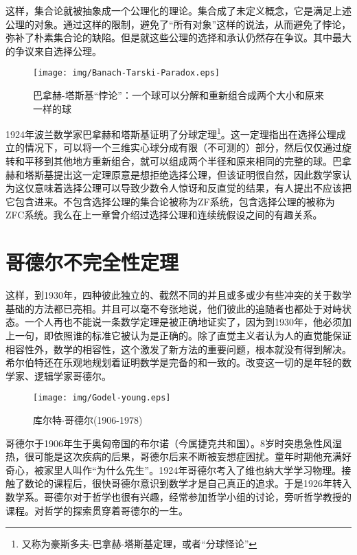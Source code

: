 \documentclass{article}
\begin{document}
这样，集合论就被抽象成一个公理化的理论。集合成了未定义概念，它是满足上述公理的对象。通过这样的限制，避免了“所有对象”这样的说法，从而避免了悖论，弥补了朴素集合论的缺陷。但是就这些公理的选择和承认仍然存在争议。其中最大的争议来自选择公理。

\begin{figure}[htbp]
 \centering
 \texttt{[image: img/Banach-Tarski-Paradox.eps]}
 \caption{巴拿赫-塔斯基“悖论”：一个球可以分解和重新组合成两个大小和原来一样的球}
 \label{fig:Banach-Tarski-Paradox}
\end{figure}

 
1924年波兰数学家巴拿赫和塔斯基证明了分球定理\footnote{又称为豪斯多夫-巴拿赫-塔斯基定理，或者“分球怪论”}。这一定理指出在选择公理成立的情况下，可以将一个三维实心球分成有限（不可测的）部分，然后仅仅通过旋转和平移到其他地方重新组合，就可以组成两个半径和原来相同的完整的球。巴拿赫和塔斯基提出这一定理原意是想拒绝选择公理，但该证明很自然，因此数学家认为这仅意味着选择公理可以导致少数令人惊讶和反直觉的结果，有人提出不应该把它包含进来。不包含选择公理的集合论被称为ZF系统，包含选择公理的被称为ZFC系统。我么在上一章曾介绍过选择公理和连续统假设之间的有趣关系。

\section{哥德尔不完全性定理}

这样，到1930年，四种彼此独立的、截然不同的并且或多或少有些冲突的关于数学基础的方法都已亮相。并且可以毫不夸张地说，他们彼此的追随者也都处于对峙状态。一个人再也不能说一条数学定理是被正确地证实了，因为到1930年，他必须加上一句，即依照谁的标准它被认为是正确的。除了直觉主义者认为人的直觉能保证相容性外，数学的相容性，这个激发了新方法的重要问题，根本就没有得到解决。希尔伯特还在乐观地规划着证明数学是完备的和一致的。改变这一切的是年轻的数学家、逻辑学家哥德尔。

\begin{wrapfigure}{L}{0.4\textwidth}
 \centering
 \texttt{[image: img/Godel-young.eps]}
 \captionsetup{labelformat=empty}
 \caption{库尔特$\cdot$哥德尔(1906-1978)}
 \label{fig:Godel-young}
\end{wrapfigure}

哥德尔于1906年生于奥匈帝国的布尔诺（今属捷克共和国）。8岁时突患急性风湿热，很可能是这次疾病的后果，哥德尔后来不断被妄想症困扰。童年时期他充满好奇心，被家里人叫作“为什么先生”。1924年哥德尔考入了维也纳大学学习物理。接触了数论的课程后，很快哥德尔意识到数学才是自己真正的追求。于是1926年转入数学系。哥德尔对于哲学也很有兴趣，经常参加哲学小组的讨论，旁听哲学教授的课程。对哲学的探索贯穿着哥德尔的一生。
\end{document}
